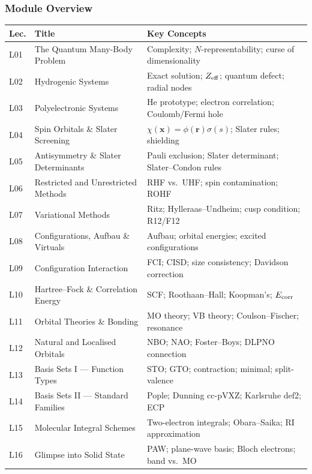 \documentclass[11pt,a4paper]{article}
\begin{document}
\subsubsection*{Module Overview}
{\footnotesize
\begin{center}
\begin{tabular}{@{}lp{4.2cm}p{6.8cm}@{}}
\toprule
\textbf{Lec.} & \textbf{Title} & \textbf{Key Concepts}\\
\midrule
L01 & The Quantum Many-Body Problem & Complexity; $N$-representability; curse of dimensionality\\
L02 & Hydrogenic Systems & Exact solution; $Z_{\rm eff}$; quantum defect; radial nodes\\
L03 & Polyelectronic Systems & He prototype; electron correlation; Coulomb/Fermi hole\\
L04 & Spin Orbitals \& Slater Screening & $\chi(\mathbf{x})=\phi(\mathbf{r})\sigma(s)$; Slater rules; shielding\\
L05 & Antisymmetry \& Slater Determinants & Pauli exclusion; Slater determinant; Slater--Condon rules\\
L06 & Restricted and Unrestricted Methods & RHF vs.\ UHF; spin contamination; ROHF\\
L07 & Variational Methods & Ritz; Hylleraas--Undheim; cusp condition; R12/F12\\
L08 & Configurations, Aufbau \& Virtuals & Aufbau; orbital energies; excited configurations\\
\midrule
L09 & Configuration Interaction & FCI; CISD; size consistency; Davidson correction\\
L10 & Hartree--Fock \& Correlation Energy & SCF; Roothaan--Hall; Koopman's; $E_{\rm corr}$\\
L11 & Orbital Theories \& Bonding & MO theory; VB theory; Coulson--Fischer; resonance\\
L12 & Natural and Localised Orbitals & NBO; NAO; Foster--Boys; DLPNO connection\\
L13 & Basis Sets I --- Function Types & STO; GTO; contraction; minimal; split-valence\\
L14 & Basis Sets II --- Standard Families & Pople; Dunning cc-pVXZ; Karlsruhe def2; ECP\\
L15 & Molecular Integral Schemes & Two-electron integrals; Obara--Saika; RI approximation\\
L16 & Glimpse into Solid State & PAW; plane-wave basis; Bloch electrons; band vs.\ MO\\
\bottomrule
\end{tabular}
\end{center}
}
\end{document}
